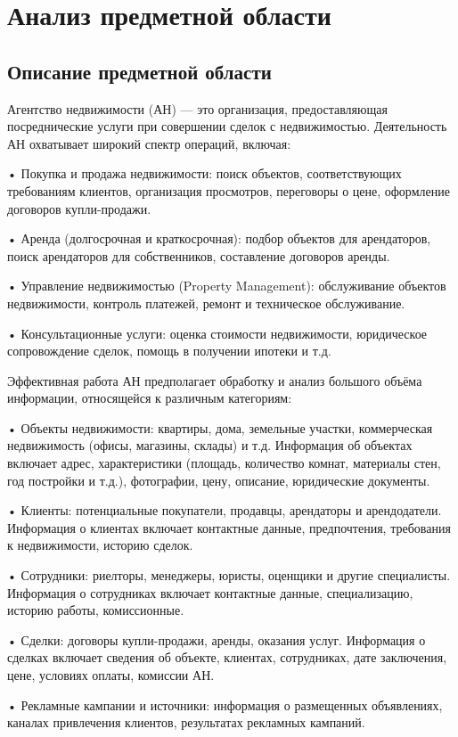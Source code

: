 \section{Анализ предметной области}
\subsection{Описание предметной области}

Агентство недвижимости (АН) — это организация, предоставляющая посреднические услуги при совершении сделок с недвижимостью. Деятельность АН охватывает широкий спектр операций, включая:

•	Покупка и продажа недвижимости: поиск объектов, соответствующих требованиям клиентов, организация просмотров, переговоры о цене, оформление договоров купли-продажи.

•	Аренда (долгосрочная и краткосрочная): подбор объектов для арендаторов, поиск арендаторов для собственников, составление договоров аренды.

•	Управление недвижимостью (Property Management): обслуживание объектов недвижимости, контроль платежей, ремонт и техническое обслуживание.

•	Консультационные услуги: оценка стоимости недвижимости, юридическое сопровождение сделок, помощь в получении ипотеки и т.д.

Эффективная работа АН предполагает обработку и анализ большого объёма информации, относящейся к различным категориям:

•	Объекты недвижимости: квартиры, дома, земельные участки, коммерческая недвижимость (офисы, магазины, склады) и т.д. Информация об объектах включает адрес, характеристики (площадь, количество комнат, материалы стен, год постройки и т.д.), фотографии, цену, описание, юридические документы.

•	Клиенты: потенциальные покупатели, продавцы, арендаторы и арендодатели. Информация о клиентах включает контактные данные, предпочтения, требования к недвижимости, историю сделок.

•	Сотрудники: риелторы, менеджеры, юристы, оценщики и другие специалисты. Информация о сотрудниках включает контактные данные, специализацию, историю работы, комиссионные.

•	Сделки: договоры купли-продажи, аренды, оказания услуг. Информация о сделках включает сведения об объекте, клиентах, сотрудниках, дате заключения, цене, условиях оплаты, комиссии АН.

•	Рекламные кампании и источники: информация о размещенных объявлениях, каналах привлечения клиентов, результатах рекламных кампаний.


